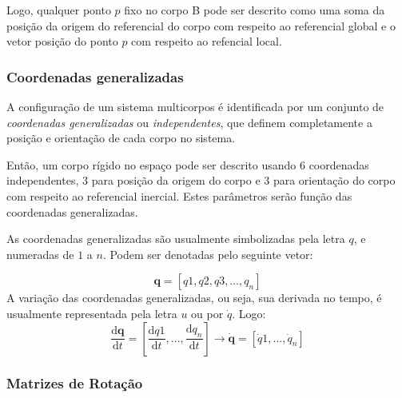 Logo, qualquer ponto $p$ fixo no corpo B pode ser descrito como uma soma da
posição da origem do referencial do corpo com respeito ao referencial global
e o vetor posição do ponto $p$ com respeito ao refencial local.


\subsubsection{Coordenadas generalizadas}

A configuração de um sistema multicorpos é identificada por um conjunto de
\emph{coordenadas generalizadas} ou \emph{independentes}, que definem
completamente a posição e orientação de cada corpo no sistema.

Então, um corpo rígido no espaço pode ser descrito usando 6 coordenadas
independentes, 3 para posição da origem do corpo e 3 para orientação do corpo
com respeito ao referencial inercial. Estes parâmetros serão função das
coordenadas generalizadas.

As coordenadas generalizadas são usualmente simbolizadas pela letra
$q$, e numeradas de $1$ a $n$. Podem ser denotadas pelo seguinte vetor:

\begin{equation}
	\mathbf{q} = [q1, q2, q3,\ldots, q_n]
\end{equation}
%
A variação das coordenadas generalizadas, ou seja, sua derivada no tempo, é
usualmente representada pela letra $u$ ou por $\dot{q}$. Logo:
%
\begin{equation}
	\frac{\mathrm{d} \mathbf{q}}{\mathrm{d} t} = \left[ \frac{\mathrm{d}
q1}{\mathrm{d} t}, ..., \frac{\mathrm{d} q_n}{\mathrm{d} t}\right] \rightarrow 
\mathbf{\dot{q}} = [\dot{q}1,...,\dot{q}_n]
\end{equation}
%


\subsubsection{Matrizes de Rotação}

